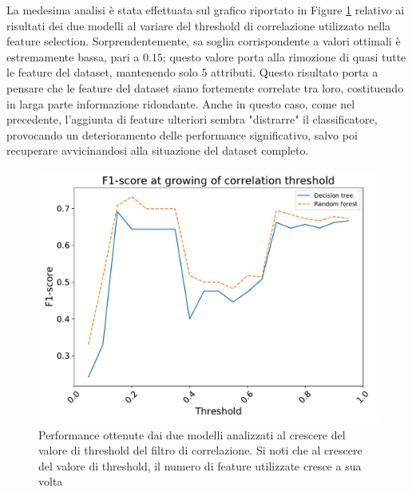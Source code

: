La medesima analisi è stata effettuata sul grafico riportato in Figure \ref{fig:corr-perf} relativo ai risultati dei due modelli al variare del threshold di correlazione utilizzato nella feature selection. Sorprendentemente, sa soglia corrispondente a valori ottimali è estremamente bassa, pari a $0.15$; questo valore porta alla rimozione di quasi tutte le feature del dataset, mantenendo solo 5 attributi. Questo risultato porta a pensare che le feature del dataset siano fortemente correlate tra loro, costituendo in larga parte informazione ridondante. Anche in questo caso, come nel precedente, l'aggiunta di feature ulteriori sembra "distrarre" il classificatore, provocando un deterioramento delle performance significativo, salvo poi recuperare avvicinandosi alla situazione del dataset completo.
\begin{figure}
	\centering
	\includegraphics[width=0.7\linewidth]{images/corr-perf}
	\caption{Performance ottenute dai due modelli analizzati al crescere del valore di threshold del filtro di correlazione. Si noti che al crescere del valore di threshold, il numero di feature utilizzate cresce a sua volta}
	\label{fig:corr-perf}
\end{figure}

